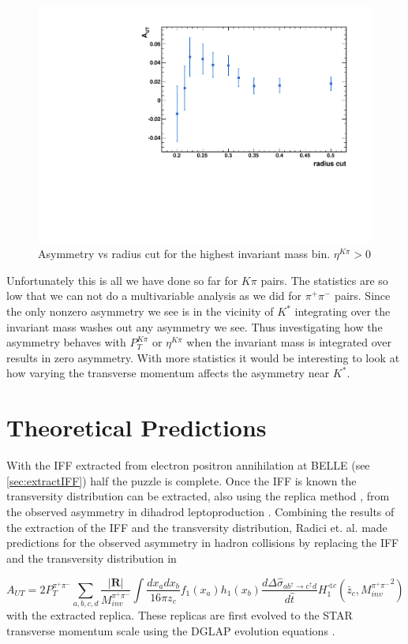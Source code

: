 \documentclass[abstract = on,listof=totoc, bibliography=totoc]{scrreprt}
\newcommand{\ptpair}{P_{T}^{\pi^+\pi^-}}
\newcommand{\mpair}{M_{inv}^{\pi^+\pi^-}}
\newcommand{\pip}{\pi^+}
\newcommand{\pim}{\pi^-}
\newcommand{\pair}{$\pip\pim$ }
\newcommand{\etakp}{\eta^{K\pi}}
\newcommand{\ptkp}{P_{T}^{K\pi}}
\begin{document}
\begin{figure}
\begin{center}
\includegraphics[width = .6\textwidth]{asymVsRadCut}
\caption[]{Asymmetry vs radius cut for the highest invariant mass bin. $\etakp > 0$}
\label{fig:asymVsRadCut}
\end{center}
\end{figure}

Unfortunately this is all we have done so far for $K\pi$ pairs. The statistics are so low that we can not do a multivariable analysis as we did for \pair pairs. Since the only nonzero asymmetry we see is in the vicinity of $K^*$ integrating over the invariant mass washes out any asymmetry we see. Thus investigating how the asymmetry behaves with $\ptkp$ or $\etakp$ when the invariant mass is integrated over results in zero asymmetry. With more statistics it would be interesting to look at how varying the transverse momentum affects the asymmetry near $K^*$.  

\chapter{Theoretical Predictions}

With the IFF extracted from electron positron annihilation at BELLE (see \ref{sec:extractIFF}) half the puzzle is complete. Once the IFF is known the transversity distribution can be extracted, also using the replica method \cite{extractIFF}, from the observed asymmetry in dihadrod leptoproduction \cite{RealEstValTrans}. Combining the results of the extraction of the IFF and the transversity distribution, Radici et. al. made predictions for the observed asymmetry in hadron collisions \cite{univTrans} by replacing the IFF and the transversity distribution in

\begin{equation}
\label{eq:crossSecUT_3}
A_{UT} = 2\ptpair \sum_{a,b,c,d} \frac{|\boldsymbol{R}|}{\mpair} \int \frac{dx_a dx_b}{16\pi z_c} f_1(x_a) h_1(x_b) \frac{d\Delta\hat{\sigma}_{a b^\uparrow \rightarrow c^\uparrow d}}{d\hat{t}} H_1^{\sphericalangle c} \left(\bar{z}_c,{\mpair}^2\right) 
\end{equation}
with the extracted replica. These replicas are first evolved to the STAR transverse momentum scale using the DGLAP evolution equations \cite{univTrans}.  
\end{document}
